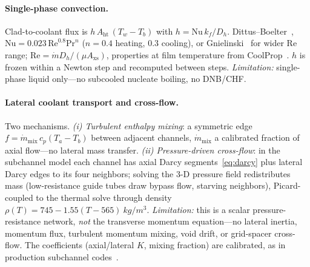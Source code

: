 \documentclass[11pt]{article}
\begin{document}
\paragraph{Single-phase convection.} Clad-to-coolant flux is $h\,A_\text{ht}\,
(T_w-T_b)$ with $h=\mathrm{Nu}\,k_f/D_h$. Dittus--Boelter~\cite{dittus},
$\mathrm{Nu}=0.023\,\mathrm{Re}^{0.8}\mathrm{Pr}^{n}$ ($n=0.4$ heating, $0.3$
cooling), or Gnielinski~\cite{gnielinski} for wider $\mathrm{Re}$ range;
$\mathrm{Re}=\dot m D_h/(\mu A_\text{xs})$, properties at film temperature from
CoolProp~\cite{coolprop}. $h$ is frozen within a Newton step and recomputed
between steps. \emph{Limitation:} single-phase liquid only---no subcooled
nucleate boiling, no DNB/CHF.

\paragraph{Lateral coolant transport and cross-flow.} Two mechanisms.
\emph{(i) Turbulent enthalpy mixing}: a symmetric edge $f=\dot m_\text{mix}\,c_p
(T_a-T_b)$ between adjacent channels, $\dot m_\text{mix}$ a calibrated fraction of
axial flow---no lateral mass transfer. \emph{(ii) Pressure-driven cross-flow}: in
the subchannel model each channel has axial Darcy segments~\eqref{eq:darcy} plus
lateral Darcy edges to its four neighbors; solving the 3-D pressure field
redistributes mass (low-resistance guide tubes draw bypass flow, starving
neighbors), Picard-coupled to the thermal solve through density
$\rho(T)=745-1.55(T-565)\ \si{kg/m^3}$. \emph{Limitation:} this is a scalar
pressure-resistance network, \emph{not} the transverse momentum equation---no
lateral inertia, momentum flux, turbulent momentum mixing, void drift, or
grid-spacer cross-flow. The coefficients (axial/lateral $K$, mixing fraction)
are calibrated, as in production subchannel codes~\cite{kelly}.
\end{document}
